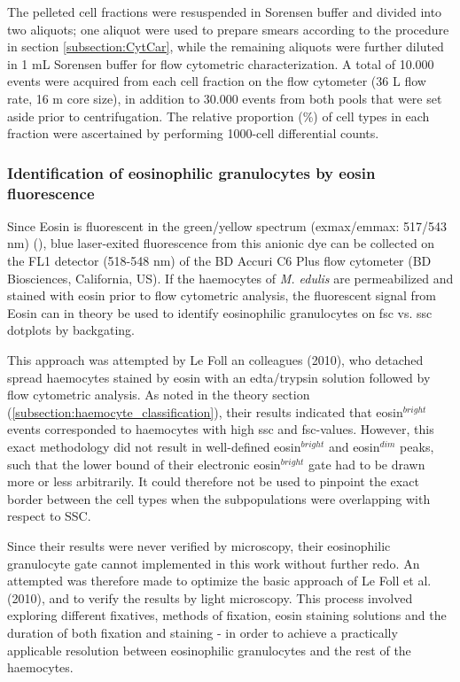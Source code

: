 The pelleted cell fractions were resuspended in Sorensen buffer and divided into two aliquots; one aliquot were used to prepare smears according to the procedure in section \ref{subsection:CytCar}, while the remaining aliquots were further diluted in 1 mL Sorensen buffer for flow cytometric characterization. A total of 10.000 events were acquired from each cell fraction on the flow cytometer (36 \micro L flow rate, 16 \micro m core size), in addition to 30.000 events from both pools that were set aside prior to centrifugation. The relative proportion (\%) of cell types in each fraction were ascertained by performing 1000-cell differential counts. 

\subsubsection{Identification of eosinophilic granulocytes by eosin fluorescence}
Since Eosin is fluorescent in the green/yellow spectrum (\acrshort{exmax}/\acrshort{emmax}: 517/543 nm) (\cite{Koegle2020}), blue laser-exited fluorescence from this anionic dye can be collected on the FL1 detector (518-548 nm) of the BD Accuri C6 Plus flow cytometer (BD Biosciences, California, US). If the haemocytes of \emph{M. edulis} are permeabilized and stained with eosin prior to flow cytometric analysis, the fluorescent signal from Eosin can in theory be used to identify eosinophilic granulocytes on \acrshort{fsc} vs. \acrshort{ssc} dotplots by backgating.

This approach was attempted by Le Foll an colleagues (2010), who detached spread haemocytes stained by eosin with an \acrshort{edta}/trypsin solution followed by flow cytometric analysis. As noted in the theory section (\ref{subsection:haemocyte_classification}), their results indicated that eosin$^{bright}$ events corresponded to haemocytes with high \acrshort{ssc} and \acrshort{fsc}-values. However, this exact methodology did not result in well-defined eosin$^{bright}$ and eosin$^{dim}$ peaks, such that the lower bound of their electronic eosin$^{bright}$ gate had to be drawn more or less arbitrarily. It could therefore not be used to pinpoint the exact border between the cell types when the subpopulations were overlapping with respect to SSC. 

Since their results were never verified by microscopy, their eosinophilic granulocyte gate cannot implemented in this work without further redo. An attempted was therefore made to optimize the basic approach of Le Foll et al. (2010), and to verify the results by light microscopy. This process involved exploring different fixatives, methods of fixation, eosin staining solutions and the duration of both fixation and staining - in order to achieve a practically applicable resolution between eosinophilic granulocytes and the rest of the haemocytes. 

